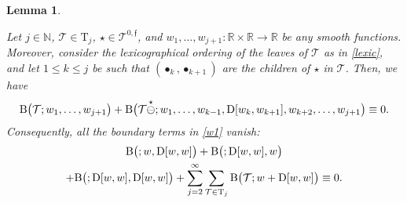 \documentclass[%
11pt,  reqno]{amsart}
\makeatletter
\newcommand{\5}{\textup{V}}
\newtheorem{lemma}[theorem]{Lemma}
\theoremstyle{remark}
\newcommand{\R}{\mathbb{R}}
\newcommand{\bul}{\bullet}
\newcommand{\TT}{\mathcal{T}}
\newcommand{\Tr}{\mathrm{T}}
\newcommand{\ff}{\mathfrak{f}}
\newcommand{\N}{\mathbb{N}}
\def\<#1>{\csname MH@symb@#1\endcsname}
\newcommand{\B}{\mathcal{B}}
\numberwithin{equation}{section}
\numberwithin{theorem}{section}
\newcommand{\BB}{\mathrm{B}}
\newcommand{\D}{\mathrm{D}}
\makeatother
\begin{document}
\begin{lemma}
\label{LEM:wbd}




Let $j\in\N$, $\TT\in \Tr_j$, 
$\star \in \TT^{0,\ff}$, and $w_1, \ldots, w_{j+1}: \R\times \R \to \R$ be any smooth functions. Moreover, consider the lexicographical ordering of the leaves of $\TT$ as in \eqref{lexic}, 
and let $1 \le k \le j$ be such that $(\bul_k, \bul_{k+1})$ are the children of $\star$ in $\TT$. 
Then, we have 
\begin{align}
\label{wbd0}
\BB\big(\TT ; w_1, \ldots, w_{j+1} \big) 
+ \BB\big(\TT\overset{\star}{\ominus} \<1>; w_1,  \ldots, w_{k-1} , \D[w_k,w_{k+1}] , w_{k+2}, \ldots,  w_{j+1} \big) 
\equiv 0.
\end{align}
Consequently, all the boundary terms in \eqref{w1} vanish:
\begin{multline}
\label{wbd1}
  \BB \big(\<1>; w, \D[w, w] \big) 
+ \BB\big(\<1>; \D[w, w],w\big) 
\\
+
\BB\big(\<1>;\D[w, w], \D[w, w]\big)
+ \sum_{j=2}^\infty \sum_{\TT\in \Tr_j}  \BB\big(\TT; w + \D[w, w]\big)  \equiv 0  .
\end{multline}


\end{lemma}
\end{document}
